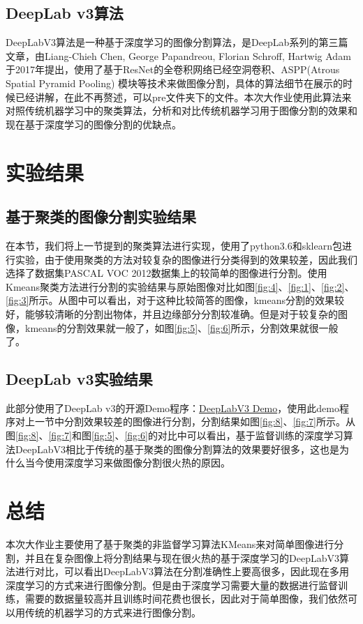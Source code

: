 \documentclass[a4paper]{article}
\begin{document}
\subsection{DeepLab v3算法}
DeepLabV3算法是一种基于深度学习的图像分割算法，是DeepLab系列的第三篇文章，由Liang-Chieh Chen, George Papandreou, Florian Schroff, Hartwig Adam于2017年提出，使用了基于ResNet的全卷积网络已经空洞卷积、ASPP(Atrous Spatial Pyramid Pooling) 模块等技术来做图像分割，具体的算法细节在展示的时候已经讲解，在此不再赘述，可以pre文件夹下的文件。本次大作业使用此算法来对照传统机器学习中的聚类算法，分析和对比传统机器学习用于图像分割的效果和现在基于深度学习的图像分割的优缺点。



\section{实验结果}

\subsection{基于聚类的图像分割实验结果}
在本节，我们将上一节提到的聚类算法进行实现，使用了python3.6和sklearn包进行实验，由于使用聚类的方法对较复杂的图像进行分类得到的效果较差，因此我们选择了数据集PASCAL VOC 2012数据集上的较简单的图像进行分割。使用Kmeans聚类方法进行分割的实验结果与原始图像对比如图\ref{fig:4}、\ref{fig:1}、\ref{fig:2}、\ref{fig:3}所示。从图中可以看出，对于这种比较简答的图像，kmeans分割的效果较好，能够较清晰的分割出物体，并且边缘部分分割较准确。但是对于较复杂的图像，kmeans的分割效果就一般了，如图\ref{fig:5}、\ref{fig:6}所示，分割效果就很一般了。



\subsection{DeepLab v3实验结果}
此部分使用了DeepLab v3的开源Demo程序：\href{https://colab.research.google.com/github/tensorflow/models/blob/master/research/deeplab/deeplab_demo.ipynb#scrollTo=SZst78N-4OKO}{DeepLabV3 Demo}，使用此demo程序对上一节中分割效果较差的图像进行分割，分割结果如图\ref{fig:8}、\ref{fig:7}所示。从图\ref{fig:8}、\ref{fig:7}和图\ref{fig:5}、\ref{fig:6}的对比中可以看出，基于监督训练的深度学习算法DeepLabV3相比于传统的基于聚类的图像分割算法的效果要好很多，这也是为什么当今使用深度学习来做图像分割很火热的原因。


\section{总结}
本次大作业主要使用了基于聚类的非监督学习算法KMeans来对简单图像进行分割，并且在复杂图像上将分割结果与现在很火热的基于深度学习的DeepLabV3算法进行对比，可以看出DeepLabV3算法在分割准确性上要高很多，因此现在多用深度学习的方式来进行图像分割。但是由于深度学习需要大量的数据进行监督训练，需要的数据量较高并且训练时间花费也很长，因此对于简单图像，我们依然可以用传统的机器学习的方式来进行图像分割。
\end{document}
